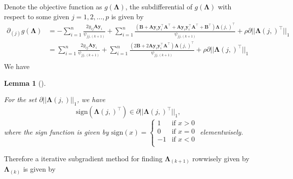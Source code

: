 \documentclass[
  a4paper,
  oneside,
  openany,
  12pt,
  onecolumn]{book}
\theoremstyle{plain}
\newtheorem{lemma}{Lemma}[chapter]
\theoremstyle{remark}
\begin{document}
Denote the objective function as \(g(\boldsymbol{\Lambda})\), the
subdifferential of \(g(\boldsymbol{\Lambda})\) with respect to some
given \(j=1,2,\dots,p\) is given by \[
\begin{align*}
\partial_{(j)}g(\boldsymbol{\Lambda})&=-\sum_{i=1}^n\frac{2y_{ij}\boldsymbol{A}\boldsymbol{y}_i}{\psi_{jj,(k+1)}}+\sum_{i=1}^n\frac{(\boldsymbol{B}+\boldsymbol{A}\boldsymbol{y}_i\boldsymbol{y}_i^\top\boldsymbol{A}^\top+\boldsymbol{A}\boldsymbol{y}_i\boldsymbol{y}_i^\top\boldsymbol{A}^\top+\boldsymbol{B}^\top)\boldsymbol{\Lambda}(j,)^\top}{\psi_{jj,(k+1)}}+\rho \partial||\boldsymbol{\Lambda}(j,)^\top||_1\\
&=\sum_{i=1}^n\frac{2y_{ij}\boldsymbol{A}\boldsymbol{y}_i}{\psi_{jj,(k+1)}}+\sum_{i=1}^n\frac{(2\boldsymbol{B}+2\boldsymbol{A}\boldsymbol{y}_i\boldsymbol{y}_i^\top\boldsymbol{A}^\top)\boldsymbol{\Lambda}(j,)^\top}{\psi_{jj,(k+1)}}+\rho \partial||\boldsymbol{\Lambda}(j,)^\top||_1\\
\end{align*}
\] We have

\begin{lemma}[]\protect\hypertarget{lem-subd}{}\label{lem-subd}

For the set \(\partial||\boldsymbol{\Lambda}(j,)||_1\), we have \[
\text{sign}(\boldsymbol{\Lambda}(j,)^\top)\in \partial||\boldsymbol{\Lambda}(j,)^\top||_1,
\] where the sign function is given by \(\text{sign}(x)=
\begin{cases}
1 &\text{if } x>0\\
0 &\text{if } x=0\\
-1 &\text{if } x<0\\
\end{cases}\) elementwisely.

\end{lemma}

Therefore a iterative subgradient method for finding
\(\boldsymbol{\Lambda}_{(k+1)}\) rowwisely given by
\(\boldsymbol{\Lambda}_{(k)}\) is given by
\end{document}
